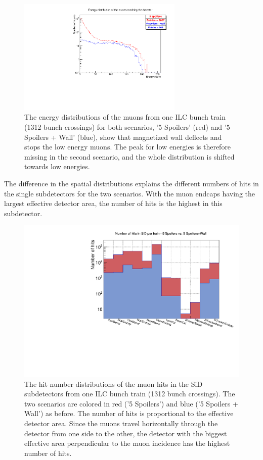 \begin{figure}
    \centering
    \includegraphics[width=0.7\textwidth]{figures/muon_energy.pdf}
    \caption[Energy distribution of muons from the two shielding scenarios]{
    The energy distributions of the muons from one ILC bunch train (1312 bunch crossings) for both scenarios, '5 Spoilers' (red) and '5 Spoilers + Wall' (blue), show that magnetized wall deflects and stops the low energy muons.
    The peak for low energies is therefore missing in the second scenario, and the whole distribution is shifted towards low energies.
    }
    \label{fig:muon_energy}
\end{figure}

The difference in the spatial distributions explains the different numbers of hits in the single subdetectors for the two scenarios.
With the muon endcaps having the largest effective detector area, the number of hits is the highest in this subdetector.

\begin{figure}
    \centering
    \includegraphics[width=\textwidth]{figures/Hits_in_SiD_subdetectors_MuonSpoilerStudy.pdf}
    \caption[Hit number distribution in the SiD subdetectors]{
    The hit number distributions of the muon hits in the SiD subdetectors from one ILC bunch train (1312 bunch crossings).
    The two scenarios are colored in red ('5 Spoilers') and blue ('5 Spoilers + Wall') as before.
    The number of hits is proportional to the effective detector area.
    Since the muons travel horizontally through the detector from one side to the other, the detector with the biggest effective area perpendicular to the muon incidence has the highest number of hits.
    }
    \label{fig:hit_distribution}
\end{figure}

